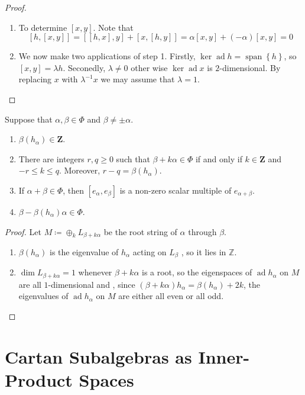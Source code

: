 \documentclass[../main.tex]{subfiles}
\begin{document}
\begin{proof}
\begin{enumerate}
        \item To determine \(  \left[ x,y \right]   \). Note that \[
        \left[ h,\left[ x,y \right]  \right]= \left[ \left[ h,x \right],y  \right]+ \left[ x,\left[ h,y \right]  \right]= \alpha [x,y]+ \left( -\alpha  \right)\left[ x,y \right]= 0     
        \] 

        \item We now make two applications of step 1. Firstly, \(  \operatorname{ker}\operatorname{ad}h= \operatorname{span}\left\{ h \right\}  \), so \(  \left[ x,y \right]=  \lambda h   \). Seconedly, \(   \lambda \neq 0  \) other wise \(  \operatorname{ker}\operatorname{ad}x  \) is \(  2  \)-dimensional. By replacing \(  x  \) with \(   \lambda ^{-1} x  \) we may assume that \(   \lambda = 1  \).        
    \end{enumerate}
    
\end{proof}

\begin{proposition}{}{}
Suppose that $\alpha, \beta \in \Phi$ and $\beta \neq \pm\alpha$.
\begin{enumerate}
    \item $\beta(h_{\alpha}) \in \mathbf{Z}$.
    \item There are integers $r, q \geq 0$ such that $\beta + k\alpha \in \Phi$ if and only if $k \in \mathbf{Z}$ and $-r \leq k \leq q$. Moreover, $r - q = \beta(h_{\alpha})$.
    \item If $\alpha + \beta \in \Phi$, then $[e_{\alpha}, e_{\beta}]$ is a non-zero scalar multiple of $e_{\alpha+\beta}$.
    \item $\beta - \beta(h_{\alpha})\alpha \in \Phi$.
\end{enumerate}
\end{proposition}

\begin{proof}
    Let \(  M\coloneqq \oplus _{k}L_{\beta + k\alpha }  \) be the root string of \(  \alpha   \) through \(  \beta   \). 
    \begin{enumerate}
        \item \(  \beta \left( h_{\alpha } \right)   \) is the eigenvalue of \(  h_{\alpha }  \) acting on \(  L_{\beta }  \)   , so it lies in \(  \mathbb{Z}   \). 
        \item \( \operatorname{dim}L_{\beta + k\alpha }= 1  \) whenever \(  \beta + k\alpha   \) is a root, so the eigenspaces of \(  \operatorname{ad}h_{\alpha }  \) on \(  M  \) are all \(  1  \)-dimensional and , since \(  \left( \beta + k\alpha  \right)h_{\alpha }= \beta \left( h_{\alpha } \right)+ 2k    \), the eigenvalues of \(  \operatorname{ad}h_{\alpha }  \) on \(  M  \) are either all even or all odd.        
    \end{enumerate}
       
\end{proof}

\section{Cartan Subalgebras as Inner-Product Spaces}
\end{document}
